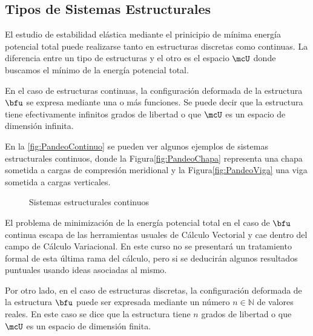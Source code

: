 
\subsection{Tipos de Sistemas Estructurales} 

El estudio de estabilidad elástica mediante el prinicipio de mínima energía potencial total puede realizarse tanto en estructuras discretas como continuas. La diferencia entre un tipo de estructuras y el otro es el espacio $\mcU$ donde buscamos el mínimo de la energía potencial total.

En el caso de estructuras continuas, la configuración deformada de la estructura $\bfu$ se expresa mediante una o más funciones. Se puede decir que la estructura tiene efectivamente infinitos grados de libertad o que $\mcU$ es un espacio de dimensión infinita.

En la \autoref{fig:PandeoContinuo} se pueden ver algunos ejemplos de sistemas estructurales continuos, donde la Figura\autoref{fig:PandeoChapa} representa una chapa sometida a cargas de compresión meridional y la Figura\autoref{fig:PandeoViga} una viga sometida a cargas verticales.

\begin{figure}[htb]
	\centering
{}
\hspace{1em}
\caption{Sistemas estructurales continuos}
	\label{fig:PandeoContinuo}
\end{figure}

El problema de minimización de la energía potencial total en el caso de $\bfu$ continua escapa de las herramientas usuales de Cálculo Vectorial y cae dentro del campo de Cálculo Variacional. En este curso no se presentará un tratamiento formal de esta última rama del cálculo, pero si se deducirán algunos resultados puntuales usando ideas asociadas al mismo.

Por otro lado, en el caso de estructuras discretas, la configuración deformada de la estructura $\bfu$ puede ser expresada mediante un número $n\in\mathbb{N}$ de valores reales. En este caso se dice que la estructura tiene $n$ grados de libertad o que $\mcU$ es un espacio de dimensión finita.

